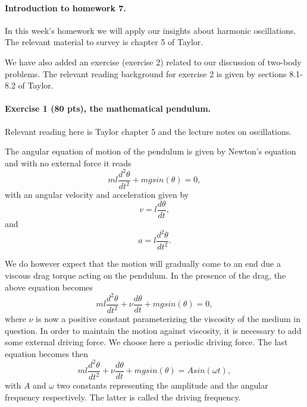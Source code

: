 \documentclass[%
oneside,                 %
final,                   %
10pt]{article}
\begin{document}
\noindent
\paragraph{Introduction to homework 7.}
In this week's homework we will apply our insights about harmonic
oscillations. The relevant material to survey is chapter 5 of Taylor.

We have also added an exercise (exercise 2) related to our discussion of two-body problems. 
The relevant reading background for exercise 2 is given by sections 8.1-8.2 of Taylor.

\paragraph{Exercise 1 (80 pts), the mathematical pendulum.}
Relevant reading here is Taylor chapter 5 and the lecture notes on oscillations. 

The angular equation of motion of the pendulum is given by
Newton's equation and with no external force it reads 
\begin{equation}
  ml\frac{d^2\theta}{dt^2}+mgsin(\theta)=0,
\end{equation}
with an angular velocity and acceleration given by
\begin{equation}
     v=l\frac{d\theta}{dt},
\end{equation}
and
\begin{equation}
     a=l\frac{d^2\theta}{dt^2}.
\end{equation}

We do however expect that the motion will gradually come to an end
due a viscous drag torque acting on the pendulum. 
In the presence of the drag, the above equation becomes
\begin{equation}
   ml\frac{d^2\theta}{dt^2}+\nu\frac{d\theta}{dt}  +mgsin(\theta)=0,
\label{eq:pend1}
\end{equation}
where $\nu$ is now a positive constant parameterizing the viscosity
of the medium in question. In order to maintain the motion against
viscosity, it is necessary to add some external driving force. 
We choose here a periodic driving force. The last equation becomes then
\begin{equation}
   ml\frac{d^2\theta}{dt^2}+\nu\frac{d\theta}{dt}  +mgsin(\theta)=Asin(\omega t),
\label{eq:pend2}
\end{equation}
with $A$ and $\omega$ two constants representing the amplitude and 
the angular frequency respectively. The latter is called the driving frequency.
\end{document}
